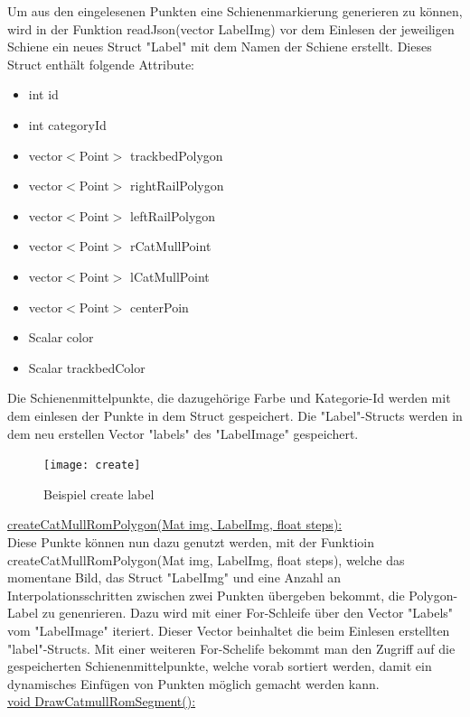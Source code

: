 \documentclass[11pt]{scrartcl}
\begin{document}
\noindent
Um aus den eingelesenen Punkten eine Schienenmarkierung generieren zu können, wird in der Funktion readJson(vector LabelImg) vor dem Einlesen der jeweiligen Schiene ein neues Struct "Label" mit dem Namen der Schiene erstellt. Dieses Struct enthält folgende Attribute:
\begin{itemize}
	\item int id
	\item int categoryId
	\item vector$<$Point$>$ trackbedPolygon
	\item vector$<$Point$>$  rightRailPolygon
	\item vector$<$Point$>$  leftRailPolygon
	\item vector$<$Point$>$  rCatMullPoint
	\item vector$<$Point$>$  lCatMullPoint
	\item vector$<$Point$>$  centerPoin
	\item Scalar color
	\item Scalar trackbedColor
\end{itemize}
\noindent
Die Schienenmittelpunkte, die dazugehörige Farbe und Kategorie-Id werden mit dem einlesen der Punkte in dem Struct gespeichert. Die "Label"-Structs werden in dem neu erstellen Vector "labels" des "LabelImage" gespeichert. 
\begin{figure}[H]
  \texttt{[image: create]}
  \caption{Beispiel create label}
\end{figure}
\noindent
\underline{createCatMullRomPolygon(Mat img, LabelImg, float steps):}
\\

\noindent
Diese Punkte können nun dazu genutzt werden, mit der Funktioin createCatMullRomPolygon(Mat img, LabelImg, float steps), welche das momentane Bild, das Struct "LabelImg" und eine Anzahl an Interpolationsschritten zwischen zwei Punkten übergeben bekommt, die Polygon-Label zu genenrieren. Dazu wird mit einer For-Schleife über den Vector "Labels" vom "LabelImage" iteriert. Dieser Vector beinhaltet die beim Einlesen erstellten "label"-Structs. Mit einer weiteren For-Schelife bekommt man den Zugriff auf die gespeicherten Schienenmittelpunkte, welche vorab sortiert werden, damit ein dynamisches Einfügen von Punkten möglich gemacht werden kann.
\\

\noindent
\underline{void DrawCatmullRomSegment():}
\\
\end{document}
